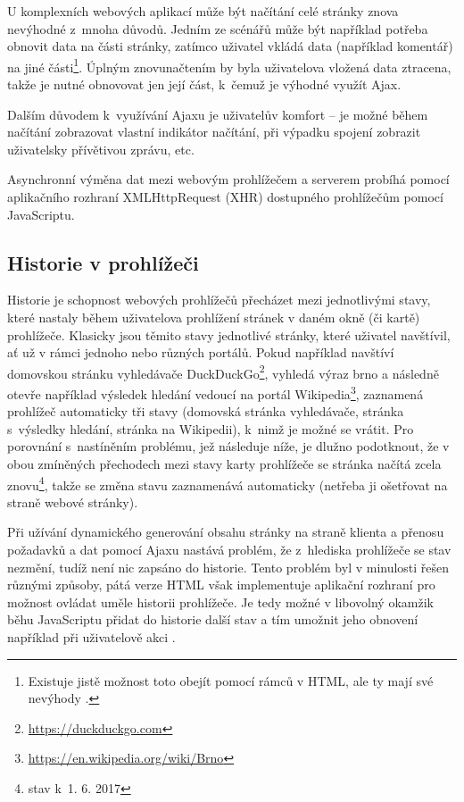 \documentclass[a4paper, 11pt, oneside, showtrims]{book}
\newcommand\ex{\textsf}
\begin{document}
					U komplexních webových aplikací může být načítání celé stránky znova nevýhodné z~mnoha důvodů. Jedním ze scénářů může být například potřeba obnovit data na části stránky, zatímco uživatel vkládá data (například komentář) na jiné části\footnote{Existuje jistě možnost toto obejít pomocí rámců v HTML, ale ty mají své nevýhody \parencite{frames2013bad}.}. Úplným znovunačtením by byla uživatelova vložená data ztracena, takže je nutné obnovovat jen její část, k~čemuž je výhodné využít Ajax.

					Dalším důvodem k~využívání Ajaxu je uživatelův komfort -- je možné během načítání zobrazovat vlastní indikátor načítání, při výpadku spojení zobrazit uživatelsky přívětivou zprávu, etc.

					Asynchronní výměna dat mezi webovým prohlížečem a serverem probíhá pomocí aplikačního rozhraní XMLHttpRequest (XHR) dostupného prohlížečům pomocí JavaScriptu. \parencite{mozilla2017XMLHTTP}

				\subsection{Historie v prohlížeči}

					Historie je schopnost webových prohlížečů přecházet mezi jednotlivými stavy, které nastaly během uživatelova prohlížení stránek v daném okně (či kartě) prohlížeče. Klasicky jsou těmito stavy jednotlivé stránky, které uživatel navštívil, ať už v rámci jednoho nebo různých portálů. Pokud například navštíví domovskou stránku vyhledávače DuckDuckGo\footnote{\url{https://duckduckgo.com}}, vyhledá výraz \ex{brno} a následně otevře například výsledek hledání vedoucí na portál Wikipedia\footnote{\url{https://en.wikipedia.org/wiki/Brno}}, zaznamená prohlížeč automaticky tři stavy (domovská stránka vyhledávače, stránka s~výsledky hledání, stránka na Wikipedii), k~nimž je možné se vrátit. Pro porovnání s~nastíněním problému, jež následuje níže, je dlužno podotknout, že v obou zmíněných přechodech mezi stavy karty prohlížeče se stránka načítá zcela znovu\footnote{stav k~1. 6. 2017}, takže se změna stavu zaznamenává automaticky (netřeba ji ošetřovat na straně webové stránky).

					Při užívání dynamického generování obsahu stránky na straně klienta a přenosu požadavků a dat pomocí Ajaxu nastává problém, že z~hlediska prohlížeče se stav nezmění, tudíž není nic zapsáno do historie. Tento problém byl v minulosti řešen různými způsoby, pátá verze HTML však implementuje aplikační rozhraní pro možnost ovládat uměle historii prohlížeče. Je tedy možné v libovolný okamžik běhu JavaScriptu přidat do historie další stav a tím umožnit jeho obnovení například při uživatelově akci .
\end{document}
